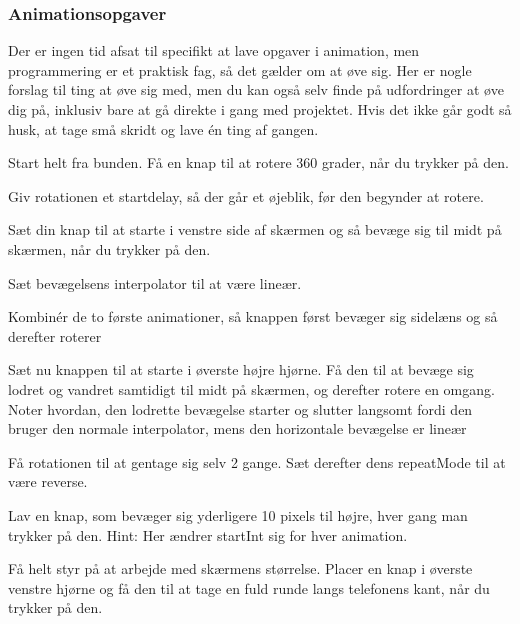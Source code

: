 \subsubsection{Animationsopgaver}
Der er ingen tid afsat til specifikt at lave opgaver i animation, men programmering er et praktisk fag, så det gælder om at øve sig. Her er nogle forslag til ting at øve sig med, men du kan også selv finde på udfordringer at øve dig på, inklusiv bare at gå direkte i gang med projektet. Hvis det ikke går godt så husk, at tage små skridt og lave én ting af gangen.
\begin{exercise}
	Start helt fra bunden. Få en knap til at rotere 360 grader, når du trykker på den.
\end{exercise}
\begin{exercise}
	Giv rotationen et startdelay, så der går et øjeblik, før den begynder at rotere.
\end{exercise}
\begin{exercise}
	Sæt din knap til at starte i venstre side af skærmen og så bevæge sig til midt på skærmen, når du trykker på den.
\end{exercise}
\begin{exercise}
	Sæt bevægelsens interpolator til at være lineær.
\end{exercise}
\begin{exercise}
	Kombinér de to første animationer, så knappen først bevæger sig sidelæns og så derefter roterer
\end{exercise}
\begin{exercise}
	Sæt nu knappen til at starte i øverste højre hjørne. Få den til at bevæge sig lodret og vandret samtidigt til midt på skærmen, og derefter rotere en omgang. Noter hvordan, den lodrette bevægelse starter og slutter langsomt fordi den bruger den normale interpolator, mens den horizontale bevægelse er lineær
\end{exercise}
\begin{exercise}
	Få rotationen til at gentage sig selv 2 gange. Sæt derefter dens repeatMode til at være reverse.
\end{exercise}
\begin{exercise}
	Lav en knap, som bevæger sig yderligere 10 pixels til højre, hver gang man trykker på den. Hint: Her ændrer startInt sig for hver animation.
\end{exercise}
\begin{exercise}
	Få helt styr på at arbejde med skærmens størrelse. Placer en knap i øverste venstre hjørne og få den til at tage en fuld runde langs telefonens kant, når du trykker på den. 
\end{exercise}

